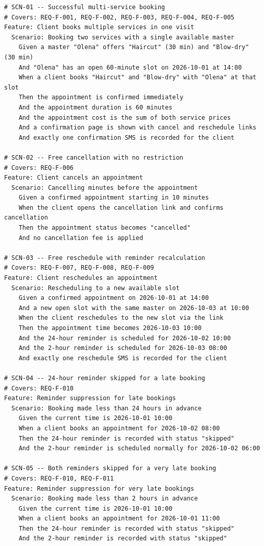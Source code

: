 \documentclass[11pt,a4paper]{article}
\begin{document}
\begin{lstlisting}
# SCN-01 -- Successful multi-service booking
# Covers: REQ-F-001, REQ-F-002, REQ-F-003, REQ-F-004, REQ-F-005
Feature: Client books multiple services in one visit
  Scenario: Booking two services with a single available master
    Given a master "Olena" offers "Haircut" (30 min) and "Blow-dry" (30 min)
    And "Olena" has an open 60-minute slot on 2026-10-01 at 14:00
    When a client books "Haircut" and "Blow-dry" with "Olena" at that slot
    Then the appointment is confirmed immediately
    And the appointment duration is 60 minutes
    And the appointment cost is the sum of both service prices
    And a confirmation page is shown with cancel and reschedule links
    And exactly one confirmation SMS is recorded for the client

# SCN-02 -- Free cancellation with no restriction
# Covers: REQ-F-006
Feature: Client cancels an appointment
  Scenario: Cancelling minutes before the appointment
    Given a confirmed appointment starting in 10 minutes
    When the client opens the cancellation link and confirms cancellation
    Then the appointment status becomes "cancelled"
    And no cancellation fee is applied

# SCN-03 -- Free reschedule with reminder recalculation
# Covers: REQ-F-007, REQ-F-008, REQ-F-009
Feature: Client reschedules an appointment
  Scenario: Rescheduling to a new available slot
    Given a confirmed appointment on 2026-10-01 at 14:00
    And a new open slot with the same master on 2026-10-03 at 10:00
    When the client reschedules to the new slot via the link
    Then the appointment time becomes 2026-10-03 10:00
    And the 24-hour reminder is scheduled for 2026-10-02 10:00
    And the 2-hour reminder is scheduled for 2026-10-03 08:00
    And exactly one reschedule SMS is recorded for the client

# SCN-04 -- 24-hour reminder skipped for a late booking
# Covers: REQ-F-010
Feature: Reminder suppression for late bookings
  Scenario: Booking made less than 24 hours in advance
    Given the current time is 2026-10-01 10:00
    When a client books an appointment for 2026-10-02 08:00
    Then the 24-hour reminder is recorded with status "skipped"
    And the 2-hour reminder is scheduled normally for 2026-10-02 06:00

# SCN-05 -- Both reminders skipped for a very late booking
# Covers: REQ-F-010, REQ-F-011
Feature: Reminder suppression for very late bookings
  Scenario: Booking made less than 2 hours in advance
    Given the current time is 2026-10-01 10:00
    When a client books an appointment for 2026-10-01 11:00
    Then the 24-hour reminder is recorded with status "skipped"
    And the 2-hour reminder is recorded with status "skipped"


\end{lstlisting}
\end{document}
